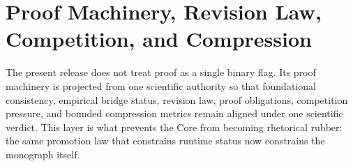 \section{Proof Machinery, Revision Law, Competition, and Compression}

The present release does not treat proof as a single binary flag. Its proof
machinery is projected from one scientific authority so that foundational
consistency, empirical bridge status, revision law, proof obligations,
competition pressure, and bounded compression metrics remain aligned under one
scientific verdict. This layer is what prevents the Core from becoming
rhetorical rubber: the same promotion law that constrains runtime status now
constrains the monograph itself.

\begingroup
\small

\endgroup

